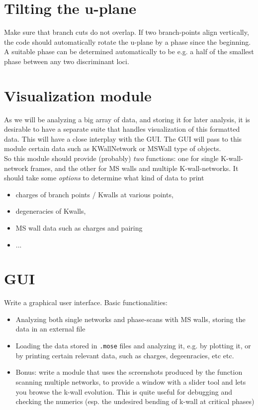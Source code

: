 \documentclass[11pt]{report}
\begin{document}
\section{Tilting the u-plane}
Make sure that branch cuts do not overlap. If two branch-points align vertically, the code should automatically rotate the u-plane by a phase since the beginning.
A suitable phase can be determined automatically to be e.g. a half of the smallest phase between any two discriminant loci.



\section{Visualization module}
As we will be analyzing a big array of data, and storing it for later analysis, it is desirable to have a separate suite that handles visualization of this formatted data.
This will have a close interplay with the GUI. The GUI will pass to this module certain data such as KWallNetwork or MSWall type of objects.\\
So this module should provide (probably) \emph{two} functions: one for single K-wall-network frames, and the other for MS walls and multiple K-wall-networks. 
It should take some \emph{options} to determine what kind of data to print 
\begin{itemize}
\item charges of branch points / Kwalls at various points, 
\item degeneracies of Kwalls, 
\item MS wall data such as charges and pairing
\item ...
\end{itemize}




\section{GUI}
Write a graphical user interface. Basic functionalities:
\begin{itemize}
	\item Analyzing both single networks and phase-scans with MS walls, storing the data in an external file
	\item Loading the data stored in {\tt*.mose} files and analyzing it, e.g. by plotting it, or by printing certain relevant data, such as charges, degeenracies, etc etc.
	\item Bonus: write a module that uses the screenshots produced by the function scanning multiple networks, to provide a window with a slider tool and lets you browse the k-wall evolution. This is quite useful for debugging and checking the numerics (esp. the undesired bending of k-wall at critical phases)
\end{itemize}
\end{document}
